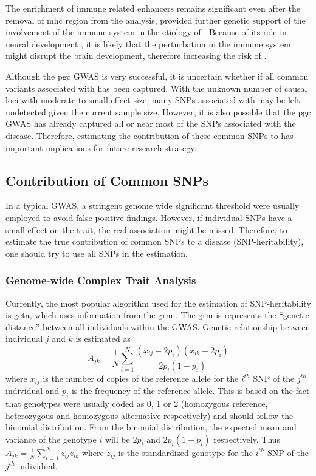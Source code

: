 	The enrichment of immune related enhancers remains significant even after the removal of \gls{mhc} region from the analysis, provided further genetic support of the involvement of the immune system in the etiology of .
	Because of its role in neural development \citep{Zhao1998,Deverman2009}, it is likely that the perturbation in the immune system might disrupt the brain development, therefore increasing the risk of .
	
	Although the \gls{pgc}  \gls{GWAS} is very successful, it is uncertain whether if all common variants associated with  has been captured. 
	With the unknown number of causal loci with moderate-to-small effect size, many \glspl{SNP} associated with  may be left undetected given the current sample size. 
	However, it is also possible that the \gls{pgc}  \gls{GWAS} has already captured all or near most of the \glspl{SNP} associated with the disease. 
	Therefore, estimating the contribution of these common \glspl{SNP} to  has important implications for future research strategy.
	
	\subsection{Contribution of Common SNPs}
	In a typical \gls{GWAS}, a stringent genome wide significant threshold were usually employed to avoid false positive findings. 
	However, if individual \glspl{SNP} have a small effect on the trait, the real association might be missed.
	Therefore, to estimate the true contribution of common \glspl{SNP} to a disease (\gls{SNP}-heritability), one should try to use all \glspl{SNP} in the estimation.
	
	\subsubsection{Genome-wide Complex Trait Analysis}
	Currently, the most popular algorithm used for the estimation of \gls{SNP}-heritability is \gls{gcta}, which uses information from the \gls{grm} \citep{Yang2011}.
	The \gls{grm} is represents the ``genetic distance'' between all individuals within the \gls{GWAS}.
	Genetic relationship between individual $j$ and $k$ is estimated as 
	\begin{equation}
	A_{jk} = \frac{1}{N}\sum^N_{i=1}\frac{(x_{ij}-2p_i)(x_{ik}-2p_i)}{2p_i(1-p_i)}
	\end{equation}
	where $x_{ij}$ is the number of copies of the reference allele for the $i^{th}$ \gls{SNP} of the $j^{th}$ individual and $p_i$ is the frequency of the reference allele.
	This is based on the fact that genotypes were usually coded as 0, 1 or 2 (homozygous reference, heterozygous and homozygous alternative respectively) and should follow the binomial distribution.
	From the binomial distribution, the expected mean and variance of the genotype $i$ will be $2p_i$ and $2p_i(1-p_i)$ respectively.
	Thus $A_{jk} = \frac{1}{N}\sum^N_{i=1}z_{ij}z_{ik}$ where $z_{ij}$ is the standardized genotype for the $i^{th}$ \gls{SNP} of the $j^{th}$ individual.
	
